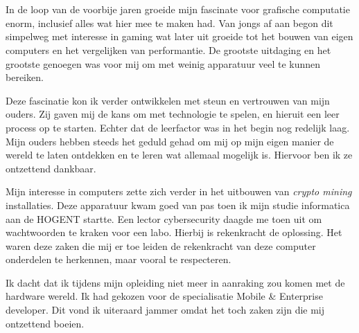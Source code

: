 
\chapter*{}%
\label{ch:voorwoord}


In de loop van de voorbije jaren groeide mijn fascinate voor grafische computatie enorm, inclusief alles wat hier mee te maken had. Van jongs af aan begon dit simpelweg met interesse in gaming wat later uit groeide tot het bouwen van eigen computers en het vergelijken van performantie. De grootste uitdaging en het grootste genoegen was voor mij om met weinig apparatuur veel te kunnen bereiken. 

\bigbreak{}

Deze fascinatie kon ik verder ontwikkelen met steun en vertrouwen van mijn ouders. Zij gaven mij de kans om met technologie te spelen, en hieruit een leer process op te starten. Echter dat de leerfactor was in het begin nog redelijk laag. Mijn ouders hebben steeds het geduld gehad om mij op mijn eigen manier de wereld te laten ontdekken en te leren wat allemaal mogelijk is. Hiervoor ben ik ze ontzettend dankbaar.

\bigbreak{}

Mijn interesse in computers zette zich verder in het uitbouwen van \textit{crypto mining} installaties. Deze apparatuur kwam goed van pas toen ik mijn studie informatica aan de HOGENT startte. Een lector cybersecurity daagde me toen uit om wachtwoorden te kraken voor een labo. Hierbij is rekenkracht de oplossing. Het waren deze zaken die mij er toe leiden de rekenkracht van deze computer onderdelen te herkennen, maar vooral te respecteren. 

\bigbreak{}

Ik dacht dat ik tijdens mijn opleiding niet meer in aanraking zou komen met de hardware wereld. Ik had gekozen voor de specialisatie Mobile \& Enterprise developer. Dit vond ik uiteraard jammer omdat het toch zaken zijn die mij ontzettend boeien.

